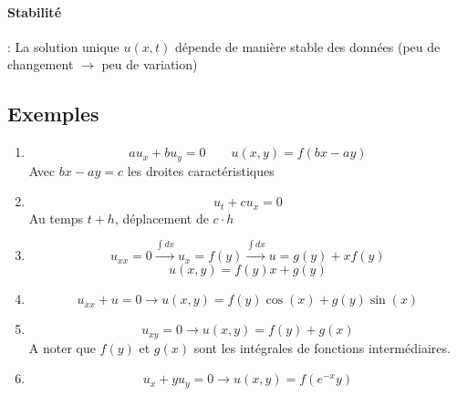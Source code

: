 \documentclass[resume]{subfiles}
\begin{document}
\paragraph{Stabilité} : La solution unique $u(x,t)$ dépende de manière stable des données (peu de changement $\to$ peu de variation)
\subsection{Exemples}
\begin{enumerate}
\item 
$$au_x+bu_y=0\qquad u(x,y)=f(bx-ay)$$
Avec $bx-ay=c$ les droites caractéristiques
\item 
$$u_t+cu_x=0$$
Au temps $t+h$, déplacement de $c\cdot h$
\item 
$$u_{xx}=0\xrightarrow{\int dx} u_x=f(y)\xrightarrow{\int dx} u=g(y)+xf(y)$$
$$u(x,y)=f(y)x+g(y)$$
\item \begin{small}$$u_{xx}+u=0\rightarrow u(x,y)=f(y)\cos(x)+g(y)\sin(x)$$\end{small}
\item $$u_{xy}=0\longrightarrow u(x,y)=f(y)+g(x)$$
A noter que $f(y)$ et $g(x)$ sont les intégrales de fonctions intermédiaires.
\item $$u_x+yu_y=0\longrightarrow u(x,y)=f(e^{-x}y)$$

\end{enumerate}
\end{document}
